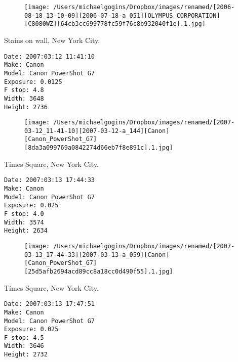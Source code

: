 \documentclass[11pt,letter,DIV=14,paper=landscape]{scrbook}
\begin{document}
\begin{figure}
\texttt{[image: /Users/michaelgogins/Dropbox/images/renamed/[2006-08-18\_13-10-09][2006-07-18-a\_051][OLYMPUS\_CORPORATION][C8080WZ][64cb3cc699778fc59f76c8b932040f1e].1.jpg]}
\end{figure}
    
\clearpage
\noindent Stains on wall, New York City.
\noindent
\begin{lstlisting}
Date: 2007:03:12 11:41:10
Make: Canon
Model: Canon PowerShot G7
Exposure: 0.0125
F stop: 4.8
Width: 3648
Height: 2736
\end{lstlisting}
\clearpage

\begin{figure}
\texttt{[image: /Users/michaelgogins/Dropbox/images/renamed/[2007-03-12\_11-41-10][2007-03-12-a\_144][Canon][Canon\_PowerShot\_G7][8da3a099769a0842274d66eb7f8e891c].1.jpg]}
\end{figure}
    
\clearpage
\noindent Times Square, New York City.
\noindent
\begin{lstlisting}
Date: 2007:03:13 17:44:33
Make: Canon
Model: Canon PowerShot G7
Exposure: 0.025
F stop: 4.0
Width: 3574
Height: 2634
\end{lstlisting}
\clearpage

\begin{figure}
\texttt{[image: /Users/michaelgogins/Dropbox/images/renamed/[2007-03-13\_17-44-33][2007-03-13-a\_059][Canon][Canon\_PowerShot\_G7][25d5afb2694acd89cc8a18cc0d490f55].1.jpg]}
\end{figure}
    
\clearpage
\noindent Times Square, New York City.
\noindent
\begin{lstlisting}
Date: 2007:03:13 17:47:51
Make: Canon
Model: Canon PowerShot G7
Exposure: 0.025
F stop: 4.5
Width: 3646
Height: 2732
\end{lstlisting}
\clearpage
\end{document}
